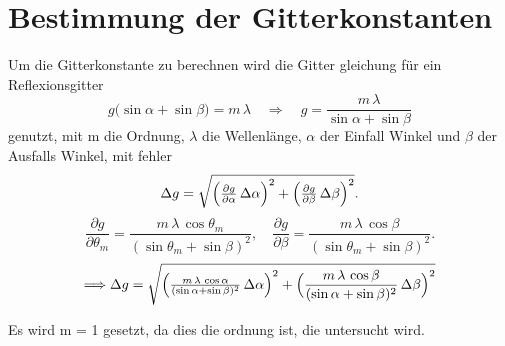 \section{Bestimmung der Gitterkonstanten}
Um die Gitterkonstante zu berechnen wird die Gitter gleichung für ein Reflexionsgitter 
\begin{equation}
  g\bigl(\sin\alpha + \sin\beta\bigr) = m\,\lambda
  \quad\Longrightarrow\quad
  g = \frac{m\,\lambda}{\sin\alpha + \sin\beta}
  \label{Gittergleichung}
\end{equation}
genutzt, mit m die Ordnung, $\lambda$ die Wellenlänge, $\alpha$ der Einfall Winkel und $\beta$ der Ausfalls Winkel, mit fehler
\begin{equation}
  \Delta g
  = \sqrt{
    \Bigl(\tfrac{\partial g}{\partial\alpha}\,\Delta\alpha\Bigr)^{2}
   +\Bigl(\tfrac{\partial g}{\partial\beta}\,\Delta\beta\Bigr)^{2}
  }.
  \label{Gitterfgleichung fehler}
\end{equation}
\begin{equation}
  \frac{\partial g}{\partial\theta_m}
  = \frac{m\,\lambda\,\cos\theta_m}{(\sin\theta_m + \sin\beta)^{2}},
  \quad
  \frac{\partial g}{\partial\beta}
  = \frac{m\,\lambda\,\cos\beta}{(\sin\theta_m + \sin\beta)^{2}}.
\end{equation}
\begin{equation}
    \Longrightarrow \Delta g = \sqrt{\Bigl(\tfrac{m\,\lambda\,\cos{\alpha}}{(\sin{\alpha}+\sin{\beta})^2}\,\Delta\alpha\Bigr)^2 + \Bigl(\frac{m\,\lambda\,\cos{\beta}}{(\sin{\alpha} + \sin{\beta})^2}\,\Delta\beta\Bigr)^2}
\end{equation}

Es wird m = 1 gesetzt, da dies die ordnung ist, die untersucht wird.


